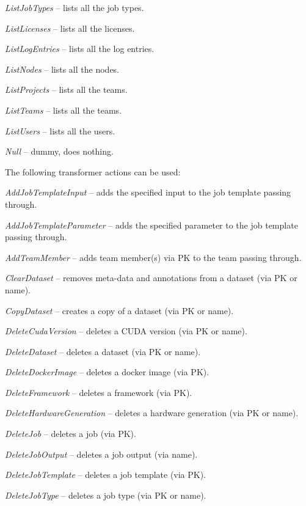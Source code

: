 \documentclass[a4paper]{book}
\begin{document}
\begin{tight_itemize}
  \item \textit{ListJobTypes} -- lists all the job types.
  \item \textit{ListLicenses} -- lists all the licenses.
  \item \textit{ListLogEntries} -- lists all the log entries.
  \item \textit{ListNodes} -- lists all the nodes.
  \item \textit{ListProjects} -- lists all the teams.
  \item \textit{ListTeams} -- lists all the teams.
  \item \textit{ListUsers} -- lists all the users.
  \item \textit{Null} -- dummy, does nothing.
\end{tight_itemize}
The following transformer actions can be used:
\begin{tight_itemize}
  \item \textit{AddJobTemplateInput} -- adds the specified input to the job template passing through.
  \item \textit{AddJobTemplateParameter} -- adds the specified parameter to the job template passing through.
  \item \textit{AddTeamMember} -- adds team member(s) via PK to the team passing through.
  \item \textit{ClearDataset} -- removes meta-data and annotations from a dataset (via PK or name).
  \item \textit{CopyDataset} -- creates a copy of a dataset (via PK or name).
  \item \textit{DeleteCudaVersion} -- deletes a CUDA version (via PK or name).
  \item \textit{DeleteDataset} -- deletes a dataset (via PK or name).
  \item \textit{DeleteDockerImage} -- deletes a docker image (via PK).
  \item \textit{DeleteFramework} -- deletes a framework (via PK).
  \item \textit{DeleteHardwareGeneration} -- deletes a hardware generation (via PK or name).
  \item \textit{DeleteJob} -- deletes a job (via PK).
  \item \textit{DeleteJobOutput} -- deletes a job output (via name).
  \item \textit{DeleteJobTemplate} -- deletes a job template (via PK).
  \item \textit{DeleteJobType} -- deletes a job type (via PK or name).

\end{tight_itemize}
\end{document}
